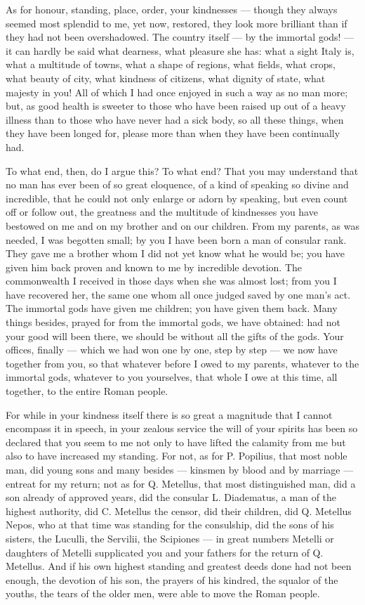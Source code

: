 As for honour, standing, place, order, your kindnesses --- though they always seemed most splendid to me, yet now, restored, they look more brilliant than if they had not been overshadowed. The country itself --- by the immortal gods! --- it can hardly be said what dearness, what pleasure she has: what a sight Italy is, what a multitude of towns, what a shape of regions, what fields, what crops, what beauty of city, what kindness of citizens, what dignity of state, what majesty in you! All of which I had once enjoyed in such a way as no man more; but, as good health is sweeter to those who have been raised up out of a heavy illness than to those who have never had a sick body, so all these things, when they have been longed for, please more than when they have been continually had.

 To what end, then, do I argue this? To what end? That you may understand that no man has ever been of so great eloquence, of a kind of speaking so divine and incredible, that he could not only enlarge or adorn by speaking, but even count off or follow out, the greatness and the multitude of kindnesses you have bestowed on me and on my brother and on our children. From my parents, as was needed, I was begotten small; by you I have been born a man of consular rank. They gave me a brother whom I did not yet know what he would be; you have given him back proven and known to me by incredible devotion. The commonwealth I received in those days when she was almost lost; from you I have recovered her, the same one whom all once judged saved by one man's act. The immortal gods have given me children; you have given them back. Many things besides, prayed for from the immortal gods, we have obtained: had not your good will been there, we should be without all the gifts of the gods. Your offices, finally --- which we had won one by one, step by step --- we now have together from you, so that whatever before I owed to my parents, whatever to the immortal gods, whatever to you yourselves, that whole I owe at this time, all together, to the entire Roman people.

 For while in your kindness itself there is so great a magnitude that I cannot encompass it in speech, in your zealous service the will of your spirits has been so declared that you seem to me not only to have lifted the calamity from me but also to have increased my standing. For not, as for P. Popilius, that most noble man, did young sons and many besides --- kinsmen by blood and by marriage --- entreat for my return; not as for Q. Metellus, that most distinguished man, did a son already of approved years, did the consular L. Diadematus, a man of the highest authority, did C. Metellus the censor, did their children, did Q. Metellus Nepos, who at that time was standing for the consulship, did the sons of his sisters, the Luculli, the Servilii, the Scipiones --- in great numbers Metelli or daughters of Metelli supplicated you and your fathers for the return of Q. Metellus. And if his own highest standing and greatest deeds done had not been enough, the devotion of his son, the prayers of his kindred, the squalor of the youths, the tears of the older men, were able to move the Roman people.

